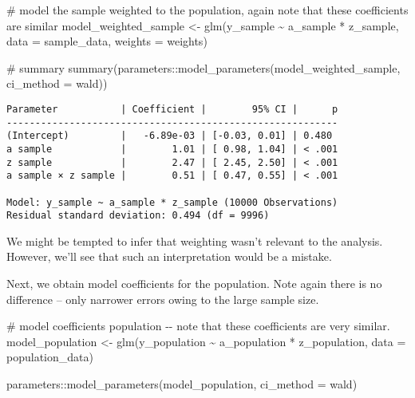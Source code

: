 \documentclass[
  single column]{article}
\newenvironment{Shaded}{\begin{snugshade}}{\end{snugshade}}
\newcommand{\AttributeTok}[1]{\textcolor[rgb]{0.40,0.45,0.13}{#1}}
\newcommand{\CommentTok}[1]{\textcolor[rgb]{0.37,0.37,0.37}{#1}}
\newcommand{\FunctionTok}[1]{\textcolor[rgb]{0.28,0.35,0.67}{#1}}
\newcommand{\NormalTok}[1]{\textcolor[rgb]{0.00,0.23,0.31}{#1}}
\newcommand{\OtherTok}[1]{\textcolor[rgb]{0.00,0.23,0.31}{#1}}
\newcommand{\SpecialCharTok}[1]{\textcolor[rgb]{0.37,0.37,0.37}{#1}}
\newcommand{\StringTok}[1]{\textcolor[rgb]{0.13,0.47,0.30}{#1}}
\begin{document}
\begin{Shaded}
\begin{Highlighting}[]
\CommentTok{\# model the sample weighted to the population, again note that these coefficients are similar }
\NormalTok{model\_weighted\_sample }\OtherTok{\textless{}{-}} \FunctionTok{glm}\NormalTok{(y\_sample }\SpecialCharTok{\textasciitilde{}}\NormalTok{ a\_sample }\SpecialCharTok{*}\NormalTok{ z\_sample, }
  \AttributeTok{data =}\NormalTok{ sample\_data, }\AttributeTok{weights =}\NormalTok{ weights)}

\CommentTok{\# summary}
\FunctionTok{summary}\NormalTok{(parameters}\SpecialCharTok{::}\FunctionTok{model\_parameters}\NormalTok{(model\_weighted\_sample, }
  \AttributeTok{ci\_method =} \StringTok{\textquotesingle{}wald\textquotesingle{}}\NormalTok{))}
\end{Highlighting}
\end{Shaded}

\begin{verbatim}
Parameter           | Coefficient |        95% CI |      p
----------------------------------------------------------
(Intercept)         |   -6.89e-03 | [-0.03, 0.01] | 0.480 
a sample            |        1.01 | [ 0.98, 1.04] | < .001
z sample            |        2.47 | [ 2.45, 2.50] | < .001
a sample × z sample |        0.51 | [ 0.47, 0.55] | < .001

Model: y_sample ~ a_sample * z_sample (10000 Observations)
Residual standard deviation: 0.494 (df = 9996)
\end{verbatim}

We might be tempted to infer that weighting wasn't relevant to the
analysis. However, we'll see that such an interpretation would be a
mistake.

Next, we obtain model coefficients for the population. Note again there
is no difference -- only narrower errors owing to the large sample size.

\begin{Shaded}
\begin{Highlighting}[]
\CommentTok{\# model coefficients population {-}{-} note that these coefficients are very similar. }
\NormalTok{model\_population }\OtherTok{\textless{}{-}} \FunctionTok{glm}\NormalTok{(y\_population }\SpecialCharTok{\textasciitilde{}}\NormalTok{ a\_population }\SpecialCharTok{*}\NormalTok{ z\_population, }
  \AttributeTok{data =}\NormalTok{ population\_data)}

\NormalTok{parameters}\SpecialCharTok{::}\FunctionTok{model\_parameters}\NormalTok{(model\_population, }\AttributeTok{ci\_method =} \StringTok{\textquotesingle{}wald\textquotesingle{}}\NormalTok{)}
\end{Highlighting}
\end{Shaded}
\end{document}
